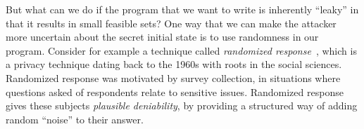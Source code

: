 \documentclass[11pt,twoside]{scrartcl}
\begin{document}

But what can we do if the program that we want to write is inherently ``leaky'' in that it results in small feasible sets? One way that we can make the attacker more uncertain about the secret initial state is to use randomness in our program. Consider for example a technique called \emph{randomized response}~\cite{Warner1965}, which is a privacy technique dating back to the 1960s with roots in the social sciences. Randomized response was motivated by survey collection, in situations where questions asked of respondents relate to sensitive issues. Randomized response gives these subjects \emph{plausible deniability}, by providing a structured way of adding random ``noise'' to their answer.
\end{document}
